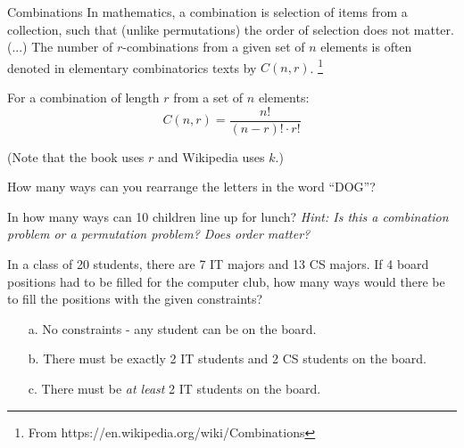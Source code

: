     \begin{intro}{Combinations}
        In mathematics, a combination is selection of items from a collection,
        such that (unlike permutations) the order of selection does not matter.
        (...) The number of $r$-combinations from a given set of $n$ elements
        is often denoted in elementary combinatorics texts by $C(n,r)$.
        \footnote{From https://en.wikipedia.org/wiki/Combinations}

        For a combination of length $r$ from a set of $n$ elements:
        $$C(n,r) = \frac{n!}{(n-r)! \cdot r!}$$

        (Note that the book uses $r$ and Wikipedia uses $k$.)
    \end{intro}
    

    \begin{questionNOGRADE}{\thequestion}
        How many ways can you rearrange the letters in the word ``DOG''?
    \end{questionNOGRADE}
    
    \hrulefill
    
    \begin{questionNOGRADE}{\thequestion}
        In how many ways can 10 children line up for lunch?
        \textit{Hint: Is this a combination problem or a permutation problem?
        Does order matter?}
    \end{questionNOGRADE}

    \hrulefill

    \begin{questionNOGRADE}{\thequestion}
        In a class of 20 students, there are 7 IT majors and 13 CS majors.
        If 4 board positions had to be filled for the computer club,
        how many ways would there be to fill the positions with the given constraints?

        \begin{enumerate}
            \item[a.]   No constraints - any student can be on the board.
            \item[b.]   There must be exactly 2 IT students and 2 CS students on the board.
            \item[c.]   There must be \textit{at least} 2 IT students on the board.
        \end{enumerate}
    \end{questionNOGRADE}

    \newpage
    
